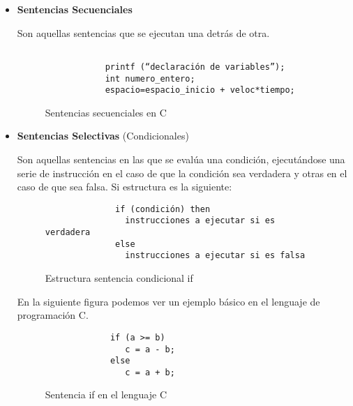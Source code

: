 \begin{itemize}
    \item \textbf{Sentencias Secuenciales}

    Son aquellas sentencias que se ejecutan una detrás de otra.

    \begin{figure}[h]
        \begin{tcolorbox}[sharp corners, colback=yellow!30, colframe=white!20]
            \scriptsize
            \begin{verbatim}

            printf (“declaración de variables”);
            int numero_entero;
            espacio=espacio_inicio + veloc*tiempo;
            \end{verbatim}
        \end{tcolorbox}
        \caption{Sentencias secuenciales en C}
    \end{figure}

     \item \textbf{Sentencias Selectivas} (Condicionales)

     Son aquellas sentencias en las que se evalúa una condición, ejecutándose una serie de instrucción en el caso de que la condición sea verdadera y otras en el caso de que sea falsa.
     Si estructura es la siguiente:

     \begin{figure}[h]
         \begin{tcolorbox}[sharp corners, colback=yellow!30, colframe=white!20]
             \scriptsize
             \begin{verbatim}
              if (condición) then
                instrucciones a ejecutar si es verdadera
              else
                instrucciones a ejecutar si es falsa
             \end{verbatim}
         \end{tcolorbox}
         \caption{Estructura sentencia condicional if}
     \end{figure}

     En la siguiente figura podemos ver un ejemplo básico en el lenguaje de programación C.

     \begin{figure}[h]
         \begin{tcolorbox}[sharp corners, colback=yellow!30, colframe=white!20]
             \scriptsize
             \begin{verbatim}
             if (a >= b)
                c = a - b;
             else
                c = a + b;
             \end{verbatim}
         \end{tcolorbox}
         \caption{Sentencia if en el lenguaje C}
     \end{figure}


\end{itemize}
